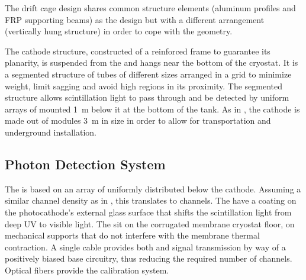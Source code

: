 
The drift cage design shares common structure elements (aluminum profiles and FRP supporting beams) as the \single {} design but with a different arrangement (vertically hung structure) in order to cope with the  geometry.

The cathode structure, constructed of a reinforced frame to guarantee its planarity, is suspended from the  and hangs near the 
bottom of the cryostat. It is a segmented structure of tubes of different sizes  arranged in a grid to minimize weight, limit sagging and avoid high \efield
regions in its proximity.  The segmented structure allows scintillation light to pass through and be detected by uniform arrays of  mounted \SI{1}{m} below it at the bottom of the tank. As in , the cathode is made out of modules \SI{3}{m} in size in order to allow for transportation and underground installation. 

\subsection{Photon Detection System}
\label{v4:fddp-ov:pd}

The  is based on an array of  uniformly distributed below the cathode. Assuming a similar channel density as in , this translates to \dpnumpmtch channels. The  have a  coating on the photocathode's external glass surface that shifts the scintillation light from deep UV to visible light. The   sit on the corrugated membrane cryostat floor, on %
mechanical supports that do not interfere with the membrane thermal contraction. %
A single cable provides both  and signal transmission by way of a positively biased base circuitry, thus reducing the required number of \fdth{} channels. Optical fibers provide the calibration system.

